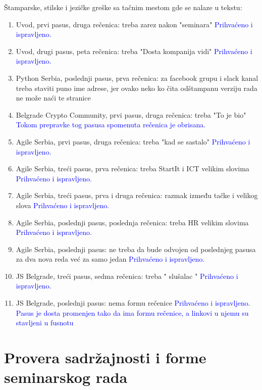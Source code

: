 \documentclass[a4paper]{report}
\newcommand{\odgovor}[1]{\textcolor{blue}{#1}}
\begin{document}
Štamparske, stilske i jezičke greške sa tačnim mestom gde se nalaze u tekstu:
\begin{enumerate}
\item Uvod, prvi pasus, druga rečenica: treba zarez nakon "{seminara}" 
\odgovor{Prihvaćeno i ispravljeno.}
\item Uvod, drugi pasus, peta rečenica: treba "{Dosta kompanija vidi}" 
\odgovor{Prihvaćeno i ispravljeno.}
\item Python Serbia, poslednji pasus, prva rečenica: za facebook grupu i slack kanal treba staviti puno ime adrese, jer ovako neko ko čita odštampanu verziju rada ne može naći te stranice
\item Belgrade Crypto Community, prvi pasus, druga rečenica: treba "To je bio" 
\odgovor{Tokom prepravke tog pasusa spomenuta rečenica je obrisana.}
\item Agile Serbia, prvi pasus, druga rečenica: treba "kad se sastalo" 
\odgovor{Prihvaćeno i ispravljeno.}
\item Agile Serbia, treći pasus, prva rečenica: treba StartIt i ICT velikim slovima 
\odgovor{Prihvaćeno i ispravljeno.}
\item Agile Serbia, treći pasus, prva i druga rečenica: razmak između tačke i velikog slova 
\odgovor{Prihvaćeno i ispravljeno.}
\item Agile Serbia, poslednji pasus, poslednja rečenica: treba HR velikim slovima 
\odgovor{Prihvaćeno i ispravljeno.}
\item Agile Serbia, poslednji pasus: ne treba da bude odvojen od poslednjeg pasusa za dva nova reda već za samo jedan 
\odgovor{Prihvaćeno i ispravljeno.}
\item JS Belgrade, treći pasus, sedma rečenica: treba " slušalac " 
\odgovor{Prihvaćeno i ispravljeno.}
\item JS Belgrade, poslednji pasus: nema formu rečenice 
\odgovor{Prihvaćeno i ispravljeno. Pasus je dosta promenjen tako da ima formu rečenice, a linkovi u njemu su stavljeni u fusnotu}
\end{enumerate}


\section{Provera sadržajnosti i forme seminarskog rada}
\end{document}
